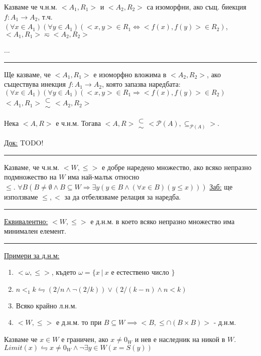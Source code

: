\documentclass[fleqn, titlepage, 12pt]{report}
\newcommand\subsetsim{\mathrel{\substack{
  \textstyle\subset\\[-0.2ex]\textstyle\sim}}}
\begin{document}
 Казваме че ч.н.м. $<A_1, R_1>$ и $<A_2, R_2>$ са изоморфни, ако същ. биекция $f: A_1 \rightarrow A_2$, т.ч.
$(\forall{x \in A_1})(\forall{y \in A_1})(<x,y> \in R_1 \Leftrightarrow <f(x), f(y)> \in R_2)$, $<A_1,R_1> \eqsim <A_2,R_2> $

...
\bigbreak
\hrule
\bigbreak

Ще казваме, че $<A_1, R_1>$ е изоморфно вложима в $ <A_2, R_2> $, ако съществува инекция $ f: A_1 \rightarrow A_2 $,
която запазва наредбата: $ (\forall{x \in A_1})(\forall{y \in A_1})(<x,y> \in R_1 \Rightarrow <f(x), f(y)> \in R_2 )$\\
$ <A_1,R_1> \subsetsim <A_2, R_2>$
\bigbreak

 Нека $ <A,R> $ е ч.н.м. Тогава $ <A,R> \subsetsim <\mathcal{P}(A), \subseteq_{\mathcal{P}(A)}>$.
\bigbreak

\underline{Док:} TODO!
\bigbreak


\bigbreak
\hrule
\begin{center}
\end{center}

 Казваме, че ч.н.м. $ <W, \leq> $ е добре наредено множество, ако всяко непразно подмножество на $ W $ има
най-малък относно\\
$ \leq $. $ \forall{B} (B \neq \emptyset \land B \subseteq W
\Rightarrow \exists{y}(y \in B \land (\forall{x \in B})(y \leq x)))$
\bigbreak
\underline{Заб:} ще използваме $ \leq, < $ за да отбелязваме релация за наредба.
\bigbreak
\hrule
\bigbreak

\underline{Еквивалентно:} $ <W,\leq> $ е д.н.м. в което всяко непразно множество има минимален елемент.

\bigbreak
\hrule
\bigbreak

\underline{Примери за д.н.м:} 
\begin{enumerate}
  \item $ <\omega,\leq>$, където $\omega = \{x\ |\ x $ е естествено число $\}$
  \item $ n <_1 k \leftrightharpoons (2 / n \land \lnot (2 / k)) \lor (2 / (k - n) \land n < k) $
  \item  Всяко крайно л.н.м. 
  \item $ <W,\leq> $ е д.н.м. то при $ B \subseteq W  \implies <B, \leq \cap (B \times B)>$ - д.н.м.
\end{enumerate}

\bigbreak
{} Казваме че $ x \in W $ е граничен, ако $ x \neq 0_W $ и нев е наследник на никой в $ W $.\\
$ Limit(x) \leftrightharpoons x \neq 0_W \land \lnot \exists{y \in W}(x = S(y)) $
\bigbreak
\end{document}

